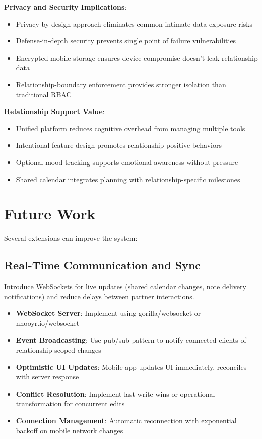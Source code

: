 \documentclass[sigconf, authorversion, nonacm, margin=0.75in]{acmart}
\begin{document}
\textbf{Privacy and Security Implications}:
\begin{itemize}
    \item Privacy-by-design approach eliminates common intimate data exposure risks
    \item Defense-in-depth security prevents single point of failure vulnerabilities
    \item Encrypted mobile storage ensures device compromise doesn't leak relationship data
    \item Relationship-boundary enforcement provides stronger isolation than traditional RBAC
\end{itemize}

\textbf{Relationship Support Value}:
\begin{itemize}
    \item Unified platform reduces cognitive overhead from managing multiple tools
    \item Intentional feature design promotes relationship-positive behaviors
    \item Optional mood tracking supports emotional awareness without pressure
    \item Shared calendar integrates planning with relationship-specific milestones
\end{itemize}

\section{Future Work}
Several extensions can improve the system:

\subsection{Real-Time Communication and Sync}
Introduce WebSockets for live updates (shared calendar changes, note delivery notifications) and reduce delays between partner interactions.
\begin{itemize}
    \item \textbf{WebSocket Server}: Implement using gorilla/websocket or nhooyr.io/websocket
    \item \textbf{Event Broadcasting}: Use pub/sub pattern to notify connected clients of relationship-scoped changes
    \item \textbf{Optimistic UI Updates}: Mobile app updates UI immediately, reconciles with server response
    \item \textbf{Conflict Resolution}: Implement last-write-wins or operational transformation for concurrent edits
    \item \textbf{Connection Management}: Automatic reconnection with exponential backoff on mobile network changes
\end{itemize}
\end{document}
